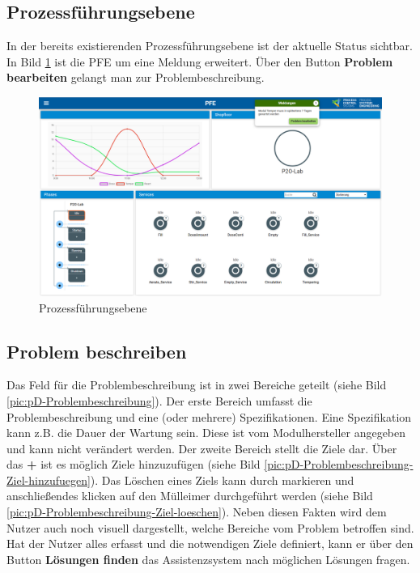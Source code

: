 \subsection{Prozessführungsebene}
In der bereits existierenden Prozessführungsebene ist der aktuelle Status sichtbar. In Bild \ref{pic:pD-PFE} ist die PFE um eine Meldung erweitert. Über den Button \textbf{Problem bearbeiten} gelangt man zur Problembeschreibung.
\begin{figure}[htbp]
\centering
\includegraphics[angle=90, scale=0.47]{DA_files/Bilder/Konzept/Skizze-PFE.png}
\caption{Prozessführungsebene}
\label{pic:pD-PFE}
\end{figure}

\subsection{Problem beschreiben}
Das Feld für die Problembeschreibung ist in zwei Bereiche geteilt (siehe Bild \ref{pic:pD-Problembeschreibung}). Der erste Bereich umfasst die Problembeschreibung und eine (oder mehrere) Spezifikationen. Eine Spezifikation kann z.B. die Dauer der Wartung sein. Diese ist vom Modulhersteller angegeben und kann nicht verändert werden. Der zweite Bereich stellt die Ziele dar. Über das \textbf{+} ist es möglich Ziele hinzuzufügen (siehe Bild \ref{pic:pD-Problembeschreibung-Ziel-hinzufuegen}). Das Löschen eines Ziels kann durch markieren und anschließendes klicken auf den Mülleimer durchgeführt werden (siehe Bild \ref{pic:pD-Problembeschreibung-Ziel-loeschen}). Neben diesen Fakten wird dem Nutzer auch noch visuell dargestellt, welche Bereiche vom Problem betroffen sind.
Hat der Nutzer alles erfasst und die notwendigen Ziele definiert, kann er über den Button \textbf{Lösungen finden} das Assistenzsystem nach möglichen Lösungen fragen.

